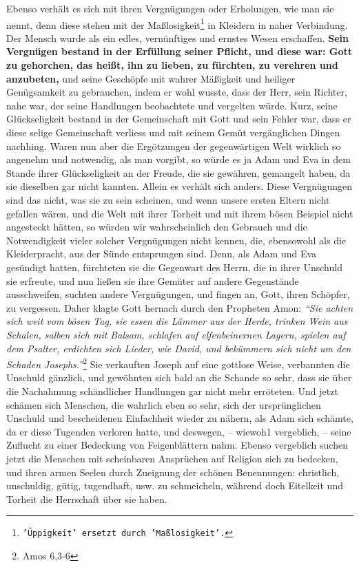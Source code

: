 Ebenso verhält es sich mit ihren Vergnügungen oder Erholungen,
wie man sie
nennt, denn diese stehen mit der
Maßlosigkeit\footnote{\texttt{'Üppigkeit' ersetzt durch 'Maßlosigkeit'.}} in
Kleidern in naher
Verbindung. Der
Mensch wurde als ein edles, vernünftiges und ernstes Wesen erschaffen.
\textbf{Sein
Vergnügen bestand in der Erfüllung seiner Pflicht, und diese war: Gott zu
gehorchen, das heißt, ihn zu lieben, zu fürchten, zu verehren und anzubeten,}
und
seine Geschöpfe mit wahrer Mäßigkeit und heiliger Genügsamkeit zu gebrauchen,
indem er wohl wusste, dass der Herr, sein Richter, nahe war, der seine
Handlungen
beobachtete und vergelten würde. Kurz, seine Glückseligkeit bestand in der
Gemeinschaft mit Gott und sein Fehler war, dass er diese selige Gemeinschaft
verliess und mit seinem Gemüt vergänglichen Dingen nachhing. Waren nun aber
die Ergötzungen der gegenwärtigen Welt wirklich so angenehm und notwendig, als
man vorgibt, so würde es ja Adam und Eva in dem Stande ihrer Glückseligkeit an
der Freude, die sie gewähren, gemangelt haben, da sie dieselben gar nicht
kannten. Allein es verhält sich anders. Diese Vergnügungen sind das nicht, was
sie zu sein scheinen, und wenn unsere ersten Eltern nicht gefallen wären, und
die Welt mit ihrer Torheit und mit ihrem bösen Beispiel nicht angesteckt
hätten, so würden wir wahrscheinlich den Gebrauch und die Notwendigkeit vieler
solcher Vergnügungen nicht kennen, die, ebensowohl als die Kleiderpracht, aus
der Sünde entsprungen sind.  Denn, als Adam und Eva gesündigt
hatten, fürchteten
sie die Gegenwart des Herrn, die in ihrer Unschuld sie erfreute, und nun ließen
sie ihre Gemüter auf andere Gegenstände ausschweifen, suchten andere
Vergnügungen, und fingen an, Gott, ihren Schöpfer, zu vergessen. Daher klagte
Gott hernach durch den Propheten Amon:
\textit{"`Sie achten sich weit vom bösen Tag,
sie essen die Lämmer aus der Herde, trinken Wein aus Schalen, salben sich mit
Balsam, schlafen auf elfenbeinernen Lagern, spielen auf dem Psalter, erdichten
sich Lieder, wie David, und bekümmern sich nicht um den Schaden
Josephs."'}\footnote{Amos 6,3-6}
Sie verkauften Joseph auf eine gottlose
Weise, verbannten die Unschuld gänzlich, und gewöhnten sich bald an die Schande
so sehr, dass sie über die Nachahmung schändlicher Handlungen gar nicht mehr
erröteten. Und jetzt schämen sich Menschen, die wahrlich eben so sehr, sich der
ursprünglichen Unschuld und bescheidenen Einfachheit wieder zu nähern, als Adam
sich schämte, da er diese Tugenden verloren hatte, und deswegen, -- wiewoh1
vergeblich, -- seine Zuflucht zu einer Bedeckung von Feigenblättern nahm. Ebenso
vergeblich suchen jetzt die Menschen mit scheinbaren Ansprüchen auf Religion
sich zu bedecken, und ihren armen Seelen durch Zueignung der schönen
Benennungen: christlich, unschuldig, gütig, tugendhaft, usw. zu schmeicheln,
während doch Eitelkeit und Torheit die Herrschaft über sie haben.

